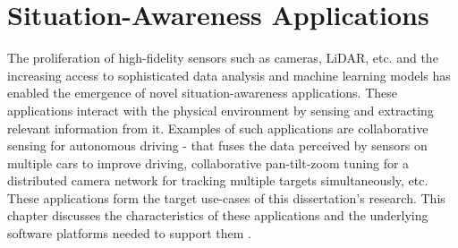 \chapter{Situation-Awareness Applications}
\label{sec:apps}

The proliferation of high-fidelity sensors such as cameras, LiDAR, etc. and the increasing access to sophisticated data analysis and machine learning models has enabled the emergence of novel situation-awareness applications. These applications interact with the physical environment by sensing and extracting relevant information from it. Examples of such applications are collaborative sensing for autonomous driving - that fuses the data perceived by sensors on multiple cars to improve driving, collaborative pan-tilt-zoom tuning for a distributed camera network for tracking multiple targets simultaneously, etc. These applications form the target use-cases of this dissertation's research. This chapter discusses the characteristics of these applications and the underlying software platforms needed to support them .
